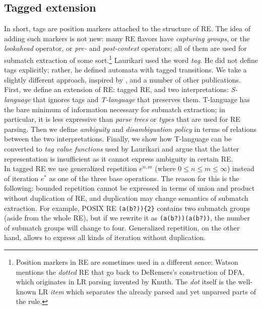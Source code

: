 \documentclass{article}
\theoremstyle{definition}
\begin{document}
\begin{multicols}{2}
\section{Tagged extension}\label{section_tagged_extension}

In short, tags are position markers attached to the structure of RE.
The idea of adding such markers is not new:
many RE flavors have \emph{capturing groups}, or the \emph{lookahead} operator, or \emph{pre-} and \emph{post-context} operators;
all of them are used for submatch extraction of some sort.\footnote{
Position markers in RE are sometimes used in a different sence:
Watson mentions the \emph{dotted} RE \cite{Wat93}
that go back to DeRemers's construction of DFA, which originates in LR parsing invented by Knuth.
The \emph{dot} itself is the well-known LR \emph{item} which separates the already parsed and yet unparsed parts of the rule.
}
Laurikari used the word \emph{tag}.
He did not define tags explicitly; rather, he defined automata with tagged transitions.
We take a slightly different approach, inspired by \cite{BT10}, \cite{Gra15} and a number of other publications.
First, we define an extension of RE: tagged RE,
and two interpretations: \emph{S-language} that ignores tags and \emph{T-language} that preserves them.
T-language has the bare minimum of information necessary for submatch extraction;
in particular, it is less expressive than \emph{parse trees} or \emph{types} that are used for RE parsing.
Then we define \emph{ambiguity} and \emph{disambiguation policy} in terms of relations between the two interpretations.
Finally, we show how T-language can be converted to \emph{tag value functions} used by Laurikari
and argue that the latter representation is insufficient as it cannot express ambiguity in certain RE.
\\

In tagged RE we use generalized repetition $e^{n,m}$ (where $0 \!\leq\! n \!\leq\! m \!\leq\! \infty$)
instead of iteration $e^*$ as one of the three base operations.
The reason for this is the following:
bounded repetition cannot be expressed in terms of union and product without duplication of RE,
and duplication may change semantics of submatch extraction.
For example, POSIX RE \texttt{(a(b?))\{2\}} contains two submatch groups (aside from the whole RE),
but if we rewrite it as \texttt{(a(b?))(a(b?))}, the number of submatch groups will change to four.
Generalized repetition, on the other hand, allows to express all kinds of iteration without duplication.
\\


\end{multicols}
\end{document}
